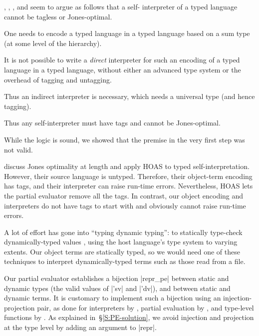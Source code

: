 , \citet{taha-tag}, \citet{xi-guarded}, and
\citet{peyton-jones-simple} seem to argue as follows that a self\hyp
interpreter of a typed language cannot be tagless or Jones\hyp optimal.
\begin{enumerate*}
\item One needs to encode a typed language in a typed language based on
a sum type (at some level of the hierarchy).
\item It is not possible to write a \emph{direct} interpreter 
for such an encoding of a typed language
in a typed language, without either an
advanced type system or the overhead of tagging and untagging.
\item Thus an indirect interpreter is necessary, which needs a universal
  type (and hence tagging).
\item Thus any self-interpreter must have tags and cannot be 
  Jones-optimal.
\end{enumerate*}
While the logic is sound, we showed that the premise in the very first step
was not valid.

\citet{Danvy-tagging-encoding} discuss Jones optimality at length and
apply HOAS to typed self\hyp interpretation.  However, their source
language is untyped.  Therefore, their object\hyp term encoding has
tags, and their interpreter can raise run-time errors.
Nevertheless, HOAS lets the partial
evaluator remove all the tags. In contrast, our object encoding and
interpreters do not have tags to start with and obviously cannot
raise run-time errors.


A lot of effort has gone into ``typing dynamic typing'': to statically
type-check dynamically\hyp typed values
\cite{baars-typing,WalidICFP02,Guillemette-Monier-PLPV,haskell-list},
using the host language's type system to varying extents.
Our object terms are statically typed, so we would
need one of these techniques to interpret dynamically\hyp typed
terms such as those read from a file.


Our partial evaluator establishes a bijection |repr_pe| between static
and dynamic types (the valid values of |'sv| and |'dv|), and between
static and dynamic terms.  It is customary to implement such a bijection
using an injection\hyp projection pair, as done for interpreters by
\cite{Ramsey-ML-module-mania,Benton-embedded-interpreters},
partial evaluation by \cite{Danvy-TDPE}, and type-level functions by
\cite{oliveira-typecase}.  As explained in~\S\ref{S:PE-solution}, we
avoid injection and projection at the type level by adding an argument
to |repr|.

